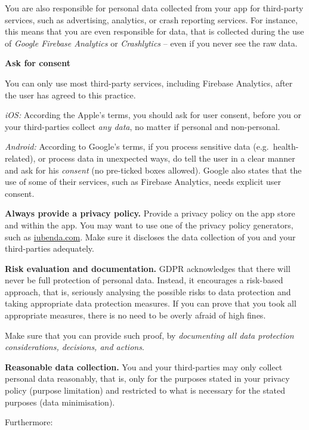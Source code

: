 \documentclass[
]{book}
\begin{document}
You are also responsible for personal data collected from your app for third-party services, such as advertising, analytics, or crash reporting services. For instance, this means that you are even responsible for data, that is collected during the use of \emph{Google Firebase Analytics} or \emph{Crashlytics} -- even if you never see the raw data.

\textbf{Ask for consent}

You can only use most third-party services, including Firebase Analytics, after the user has agreed to this practice.

\emph{iOS:} According the Apple's terms, you should ask for user consent, before you or your third-parties collect \emph{any data}, no matter if personal and non-personal.

\emph{Android:} According to Google's terms, if you process sensitive data (e.g.~health-related), or process data in unexpected ways, do tell the user in a clear manner and ask for his \emph{consent} (no pre-ticked boxes allowed). Google also states that the use of some of their services, such as Firebase Analytics, needs explicit user consent.

\textbf{Always provide a privacy policy.} Provide a privacy policy on the app store and within the app. You may want to use one of the privacy policy generators, such as \href{https://gdpr4devs.com/iubenda.com}{iubenda.com}. Make sure it discloses the data collection of you and your third-parties adequately.

\textbf{Risk evaluation and documentation.} GDPR acknowledges that there will never be full protection of personal data. Instead, it encourages a risk-based approach, that is, seriously analysing the possible risks to data protection and taking appropriate data protection measures. If you can prove that you took all appropriate measures, there is no need to be overly afraid of high fines.

Make sure that you can provide such proof, by \emph{documenting all data protection considerations, decisions, and actions}.

\textbf{Reasonable data collection.} You and your third-parties may only collect personal data reasonably, that is, only for the purposes stated in your privacy policy (purpose limitation) and restricted to what is necessary for the stated purposes (data minimisation).

Furthermore:
\end{document}
